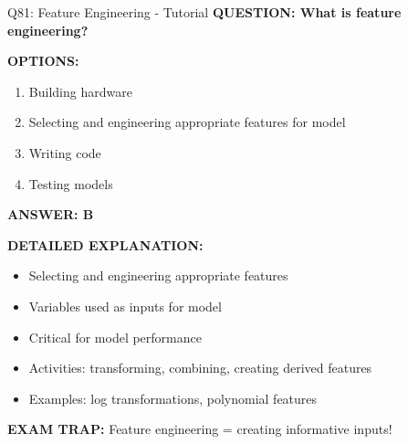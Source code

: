 \documentclass[8pt]{beamer}
\begin{document}
	\begin{frame}{Q81: Feature Engineering - Tutorial}
		\fontsize{6.5}{7.5}\selectfont
		\textbf{QUESTION: What is feature engineering?}
		
		\vspace{0.1cm}
		\textbf{OPTIONS:}
		\begin{enumerate}
			\item Building hardware
			\item Selecting and engineering appropriate features for model
			\item Writing code
			\item Testing models
		\end{enumerate}
		
		\vspace{0.1cm}
		\textcolor{myblue}{\textbf{ANSWER: B}}
		
		\vspace{0.1cm}
		\textbf{DETAILED EXPLANATION:}
		\begin{itemize}
			\item Selecting and engineering appropriate features
			\item Variables used as inputs for model
			\item Critical for model performance
			\item Activities: transforming, combining, creating derived features
			\item Examples: log transformations, polynomial features
		\end{itemize}
		
		\vspace{0.1cm}
		\textcolor{myred}{\textbf{EXAM TRAP:}} Feature engineering = \textcolor{myblue}{creating informative inputs}!
	\end{frame}
	
\end{document}
